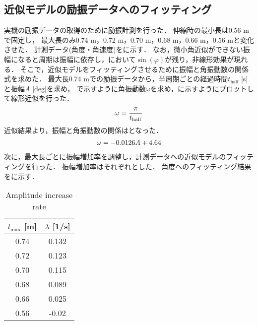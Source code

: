         \subsection{近似モデルの励振データへのフィッティング}
          
          実機の励振データの取得のために励振計測を行った．
          伸縮時の最小長は0.56 mで固定し，
          最大長のみ0.74 m，0.72 m，0.70 m，0.68 m，0.66 m，0.56 mと変化させた． 計測データ(角度・角速度)をに示す．    
          なお，微小角近似ができない振幅になると周期は振幅に依存し，において$\sin{(\varphi)}$が残り，非線形効果が現れる．
          そこで，近似モデルをフィッティングさせるために振幅と角振動数の関係式を求めた．
          最大長0.74 mでの励振データから，半周期ごとの経過時間$t_{\mathrm{half}}$ [s]と振幅$A$ [deg]を求め，
          で示すように角振動数$\omega$を求め，に示すようにプロットして線形近似を行った．
          \begin{eqnarray}
            \equlabel{T2omega}
            \omega=\frac{\pi}{t_{\mathrm{half}}}
          \end{eqnarray}
          近似結果より，振幅と角振動数の関係はとなった．
          \begin{eqnarray}
            \equlabel{A2ome}
            \omega=-0.0126A+4.64
          \end{eqnarray}
          次に，最大長ごとに振幅増加率を調整し，計測データへの近似モデルのフィッティングを行った．
          振幅増加率はそれぞれとした．
          角度へのフィッティング結果をに示す．
          \begin{table}[b]
            \begin{center}
              \caption{Amplitude increase rate}
              \vspace{2mm}
              \begin{tabular}{c|c}
                \hline
                 $l_{\mathrm{max}}$ [m] & $\lambda$ [1/s] \\
                \hline
                0.74 &  0.132\\
                0.72 &  0.123\\
                0.70 &  0.115\\
                0.68 &  0.089\\
                0.66 &  0.025\\
                0.56 &  -0.02\\                       
                \hline
              \end{tabular}
            \end{center}
          \end{table}
